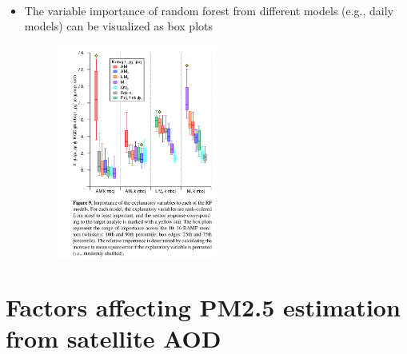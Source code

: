 \documentclass[11pt]{article}
\begin{document}
\paragraph{\citet{zimmerman2018machine}}
\begin{itemize}
    \item The variable importance of random forest from different models (e.g., daily models) can be visualized as box plots
    \begin{figure}[H]
        \centering
        \includegraphics[width=0.5\textwidth]{img/rf_imp.png}
        \label{fig:rf_imp}
    \end{figure}
\end{itemize}


\section{Factors affecting PM2.5 estimation from satellite AOD}
\end{document}
